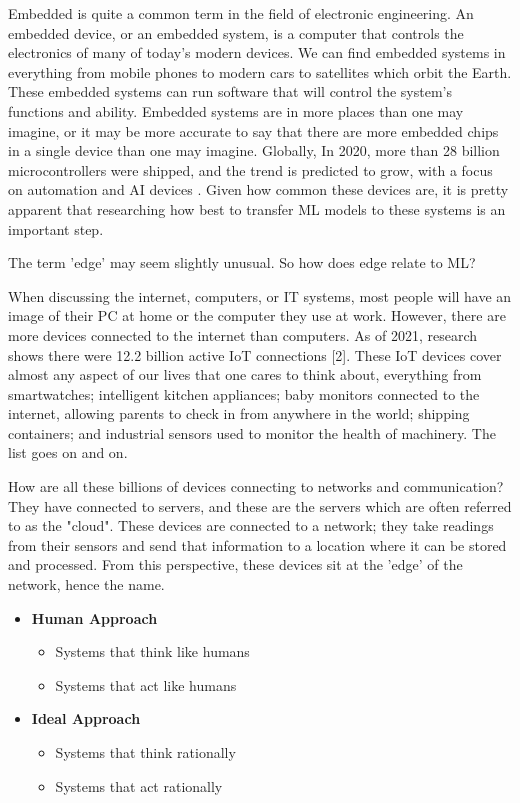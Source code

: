 \documentclass[conference]{IEEEtran}
\begin{document}
Embedded is quite a common term in the field of electronic engineering. An embedded device, or an embedded system, is a computer that controls the electronics of many of today's modern devices. We can find embedded systems in everything from mobile phones to modern cars to satellites which orbit the Earth. These embedded systems can run software that will control the system's functions and ability.
Embedded systems are in more places than one may imagine, or it may be more accurate to say that there are more embedded chips in a single device than one may imagine. Globally, In 2020, more than 28 billion microcontrollers were shipped, and the trend is predicted to grow, with a focus on automation and AI devices \cite{ucmarket}. Given how common these devices are, it is pretty apparent that researching how best to transfer ML models to these systems is an important step.

The term 'edge' may seem slightly unusual. So how does edge relate to ML? 

When discussing the internet, computers, or IT systems, most people will have an image of their PC at home or the computer they use at work. However, there are more devices connected to the internet than computers. As of 2021, research shows there were 12.2 billion active IoT connections [2]. These IoT devices cover almost any aspect of our lives that one cares to think about, everything from smartwatches; intelligent kitchen appliances; baby monitors connected to the internet, allowing parents to check in from anywhere in the world; shipping containers; and industrial sensors used to monitor the health of machinery. The list goes on and on.

How are all these billions of devices connecting to networks and communication? They have connected to servers, and these are the servers which are often referred to as the "cloud".
These devices are connected to a network; they take readings from their sensors and send that information to a location where it can be stored and processed. From this perspective, these devices sit at the 'edge' of the network, hence the name.






\begin{itemize}
    \item \textbf{Human Approach}
    \begin{itemize}
        \item Systems that think like humans
        \item Systems that act like humans
    \end{itemize}
    \item \textbf{Ideal Approach}
    \begin{itemize}
        \item Systems that think rationally
        \item Systems that act rationally
    \end{itemize}
\end{itemize}
\end{document}
